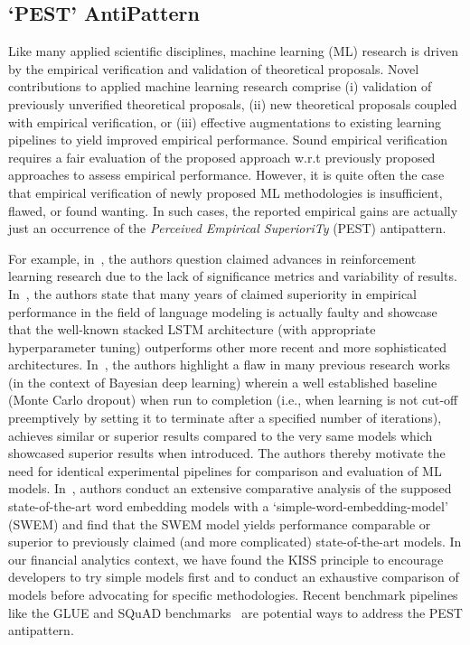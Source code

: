\subsection{`PEST' AntiPattern}\label{sec:baselines}
Like many applied scientific disciplines, machine learning (ML) research is driven by the empirical verification and validation of theoretical proposals. Novel contributions to applied machine learning research comprise (i) validation of previously unverified theoretical proposals, (ii) new theoretical proposals coupled with empirical verification, or (iii) effective augmentations to existing learning pipelines to yield improved empirical performance. Sound empirical verification requires a fair evaluation of the proposed approach w.r.t previously proposed approaches to assess
empirical performance. However, it is quite often the case that empirical verification of newly proposed ML methodologies is insufficient, flawed, or found wanting. In such cases, the reported empirical gains are actually just an occurrence of the \emph{Perceived Empirical SuperioriTy} (PEST) antipattern. 

For example, in~\cite{henderson2018deep}, the authors question claimed advances in reinforcement learning research due to the lack of significance metrics and variability of results. In~\cite{melis2017state}, the authors state that many years of claimed superiority in empirical performance in the field of language modeling is actually faulty and showcase that the well-known stacked LSTM architecture (with appropriate hyperparameter tuning) outperforms other more recent and more sophisticated architectures. In~\cite{mukhoti2018importance}, the authors highlight a flaw in many previous research works (in the context of Bayesian deep learning) wherein a well established baseline (Monte Carlo dropout) when run to completion (i.e., when learning is not cut-off preemptively by setting it to terminate after a specified number of iterations), achieves similar or superior results compared to the very same models which showcased superior results when introduced. The authors thereby motivate the need for identical experimental pipelines for comparison and evaluation of ML models. In~\cite{shen2018baseline}, authors conduct an extensive comparative analysis of the supposed state-of-the-art word embedding models with a
`simple-word-embedding-model'
(SWEM) and find that the SWEM model yields performance comparable or superior to previously claimed (and more complicated) state-of-the-art models. In our financial analytics context, we have found the KISS principle to encourage developers to try simple models first and to conduct an exhaustive comparison of models before advocating for specific methodologies. Recent benchmark pipelines like the GLUE and SQuAD benchmarks~\cite{wang2018glue,rajpurkar2016squad} are potential ways to address the PEST antipattern.
\iffalse Fig.~\ref{fig:baseline_eval_plots} showcases two types of unfair model comparisons wherein baselines are ill-suited for the problem being modeled (Fig.~\ref{fig:unfair_baseline_comparison})or  the effect of employing inappropriate architectures (Fig.~\ref{fig:fair_model_architecture}) for the data being modeled.\fi 


